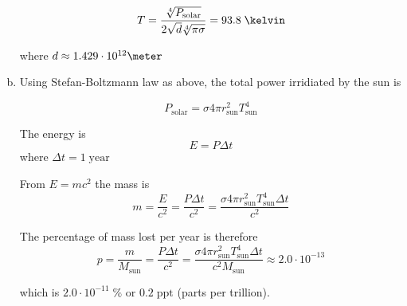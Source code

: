\documentclass[a4paper,german,12pt,smallheadings]{scrartcl}
\begin{document}
\begin{enumerate}[a)]
    \begin{equation*}
      T = \frac{\sqrt[4]{P_\text{solar}}}{2\sqrt{d} \sqrt[4]{\pi \sigma}} = 93.8\;\kelvin
    \end{equation*}

    where $d \approx 1.429 \cdot 10^{12} \meter$

  \item
    Using Stefan-Boltzmann law as above, the total power irridiated by the sun is

    \begin{equation*}
      P_\text{solar} = \sigma 4 \pi r_\text{sun}^2 T_\text{sun}^4
    \end{equation*}

    The energy is
    \begin{equation*}
      E = P \Delta t
    \end{equation*}
    where $\Delta t = 1\;\text{year}$

    From $E = mc^2$ the mass is
    \begin{equation*}
      m = \frac{E}{c^2} = \frac{P \Delta t}{c^2} = \frac{\sigma 4 \pi r_\text{sun}^2 T_\text{sun}^4 \Delta t}{c^2}
    \end{equation*}

    The percentage of mass lost per year is therefore
    \begin{equation*}
      p = \frac{m}{M_\text{sun}} = \frac{P \Delta t}{c^2} = \frac{\sigma 4 \pi r_\text{sun}^2 T_\text{sun}^4 \Delta t}{c^2 M_\text{sun}} \approx 2.0 \cdot 10^{-13}
    \end{equation*}

    which is $2.0 \cdot 10^{-11}\;\%$ or $0.2\;\text{ppt}$ (parts per trillion).


\end{enumerate}
\end{document}

